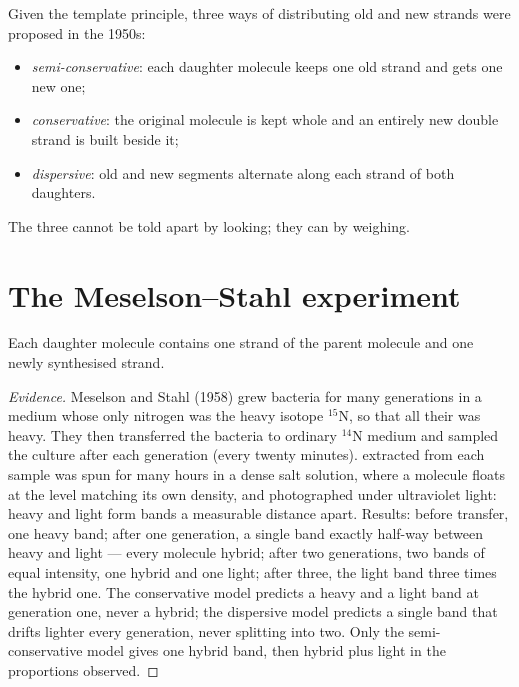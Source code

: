 \begin{example}\label{ex:g11:dna-replication:models}
Given the template principle, three ways of distributing old and new
strands were proposed in the 1950s:
\begin{itemize}
  \item \emph{semi-conservative}: each daughter molecule keeps one old
        strand and gets one new one;
  \item \emph{conservative}: the original molecule is kept whole and
        an entirely new double strand is built beside it;
  \item \emph{dispersive}: old and new segments alternate along each
        strand of both daughters.
\end{itemize}
The three cannot be told apart by looking; they can by weighing.
\end{example}

\section{The Meselson--Stahl experiment}

\begin{proposition}\label{prop:g11:dna-replication:semiconservative}
Each daughter  molecule contains one strand of the parent molecule
and one newly synthesised strand.
\end{proposition}
\begin{proof}[Evidence]
Meselson and Stahl (1958) grew bacteria for many generations in a
medium whose only nitrogen was the heavy isotope $^{15}$N, so that all
their  was heavy. They then transferred the bacteria to ordinary
$^{14}$N medium and sampled the culture after each generation
(every twenty minutes).  extracted from each sample was spun for
many hours in a dense salt solution, where a molecule floats at the
level matching its own density, and photographed under ultraviolet
light: heavy and light  form bands a measurable distance apart.
Results: before transfer, one heavy band; after one generation, a
single band exactly half-way between heavy and light --- every
molecule hybrid; after two generations, two bands of equal intensity,
one hybrid and one light; after three, the light band three times the
hybrid one. The conservative model predicts a heavy and a light band
at generation one, never a hybrid; the dispersive model predicts a
single band that drifts lighter every generation, never splitting into
two. Only the semi-conservative model gives one hybrid band, then
hybrid plus light in the proportions observed.
\end{proof}

